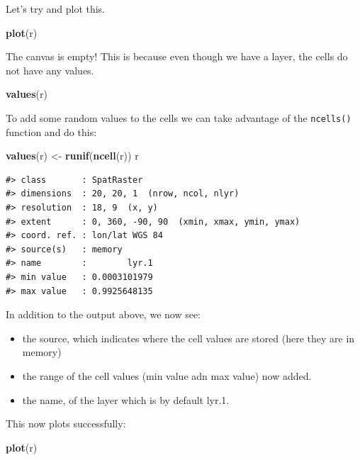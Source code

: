 \documentclass[
]{book}
\newenvironment{Shaded}{\begin{snugshade}}{\end{snugshade}}
\newcommand{\FunctionTok}[1]{\textcolor[rgb]{0.13,0.29,0.53}{\textbf{#1}}}
\newcommand{\NormalTok}[1]{#1}
\newcommand{\OtherTok}[1]{\textcolor[rgb]{0.56,0.35,0.01}{#1}}
\providecommand{\tightlist}{%
  \setlength{\itemsep}{0pt}\setlength{\parskip}{0pt}}
\begin{document}
Let's try and plot this.

\begin{Shaded}
\begin{Highlighting}[]
\FunctionTok{plot}\NormalTok{(r)}
\end{Highlighting}
\end{Shaded}

The canvas is empty! This is because even though we have a layer, the cells do not have any values.

\begin{Shaded}
\begin{Highlighting}[]
\FunctionTok{values}\NormalTok{(r)}
\end{Highlighting}
\end{Shaded}

To add some random values to the cells we can take advantage of the \texttt{ncells()} function and do this:

\begin{Shaded}
\begin{Highlighting}[]
\FunctionTok{values}\NormalTok{(r) }\OtherTok{\textless{}{-}} \FunctionTok{runif}\NormalTok{(}\FunctionTok{ncell}\NormalTok{(r))}
\NormalTok{r }
\end{Highlighting}
\end{Shaded}

\begin{verbatim}
#> class       : SpatRaster 
#> dimensions  : 20, 20, 1  (nrow, ncol, nlyr)
#> resolution  : 18, 9  (x, y)
#> extent      : 0, 360, -90, 90  (xmin, xmax, ymin, ymax)
#> coord. ref. : lon/lat WGS 84 
#> source(s)   : memory
#> name        :        lyr.1 
#> min value   : 0.0003101979 
#> max value   : 0.9925648135
\end{verbatim}

In addition to the output above, we now see:

\begin{itemize}
\tightlist
\item
  the source, which indicates where the cell values are stored (here they are in memory)
\item
  the range of the cell values (min value adn max value) now added.
\item
  the name, of the layer which is by default lyr.1.
\end{itemize}

This now plots successfully:

\begin{Shaded}
\begin{Highlighting}[]
\FunctionTok{plot}\NormalTok{(r)}
\end{Highlighting}
\end{Shaded}
\end{document}
